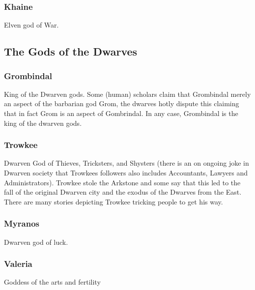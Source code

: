 \documentclass[a4paper]{style/dnd4e}
\begin{document}
\subsubsection*{Khaine}
Elven god of War.



\subsection*{The Gods of the Dwarves}

\subsubsection*{Grombindal}   
  
King of the Dwarven gods.  Some (human) 
scholars claim that Grombindal merely an aspect of the barbarian 
god Grom, the dwarves hotly dispute this claiming that in fact 
Grom is an aspect of Gombrindal.  In any case, Grombindal is the 
king of the dwarven gods.  


\subsubsection*{Trowkee}   
Dwarven God of Thieves, Tricksters, and Shysters (there is an on ongoing joke in Dwarven society
that Trowkees followers also includes Accountants, Lawyers and Administrators).
Trowkee stole the Arkstone and some say that this led to the fall of the original Dwarven
city and the exodus of the Dwarves from the East.  There are many stories depicting
Trowkee tricking people to get his way.


\subsubsection*{Myranos} 
Dwarven god of luck.  
  

\subsubsection*{Valeria} 
Goddess of the arts and fertility  
  
\end{document}
